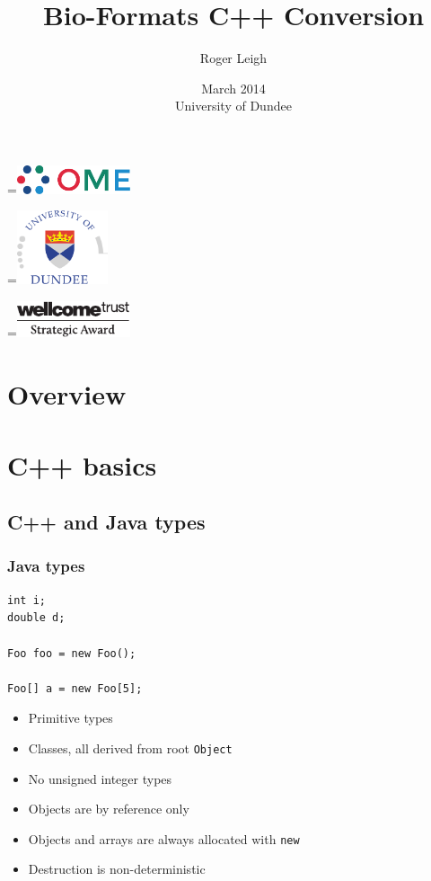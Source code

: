 \documentclass{beamer}
\title{Bio-Formats C++ Conversion}
\author{Roger Leigh}
\date{March 2014\\University of Dundee}
\newcommand*{\vcenteredhbox}[1]{\begingroup
\setbox0=\hbox{#1}\parbox{\wd0}{\box0}\endgroup}
\begin{document}
\begin{frame}[plain]
  \titlepage
  \begin{center}
    \vcenteredhbox{\includegraphics[width=0.25\textwidth]{ome}} \hfill
    \vcenteredhbox{\includegraphics[width=0.2\textwidth]{dundee}}\hfill
    \vcenteredhbox{\includegraphics[width=0.25\textwidth]{wellcome}}
  \end{center}
\end{frame}

\section*{Overview}

\section{C++ basics}
\subsection{C++ and Java types}

\begin{frame}[fragile]
  \frametitle{Java types}
  \begin{lstlisting}[lang=Java]
int i;
double d;

Foo foo = new Foo();

Foo[] a = new Foo[5];
\end{lstlisting}
  \begin{itemize}
  \item Primitive types
  \item Classes, all derived from root \texttt{Object}
  \item No unsigned integer types
  \item Objects are by reference only
  \item Objects and arrays are always allocated with \texttt{new}
  \item Destruction is non-deterministic
  \end{itemize}
\end{frame}
\end{document}
